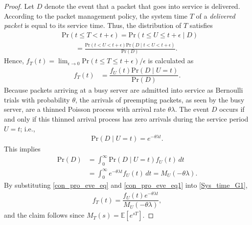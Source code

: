 \documentclass[conference]{IEEEtran}
\newcommand{\nn}{\nonumber\\}
\begin{document}
\begin{proof}
Let $D$ denote the event that a packet that goes into service is delivered. According to the packet management policy, the system time $T$ of a \textit{delivered packet} is equal to its service time. Thus, the distribution of $T$ satisfies
\begin{align}
&\mathrm{Pr}(t\le T<t+\epsilon)=\mathrm{Pr}(t\le U\le t+\epsilon\mid D)\nn
&\qquad=\frac{\mathrm{Pr}(t<U<t+\epsilon)\mathrm{Pr}(D\mid t<U<t+\epsilon)}{\mathrm{Pr}(D)}.
\end{align}
 Hence, $f_{T}(t)=\lim_{\epsilon\to0}\mathrm{Pr}(t\le T\le t+\epsilon)/\epsilon$ is calculated as 
 \begin{align}\label{Sys_time_G1}
  f_T(t)&= \dfrac{f_U(t)\mathrm{Pr}(D\mid U=t)}{\mathrm{Pr}(D)}.  
 \end{align}
% 
%
Because packets arriving at a busy server are admitted into service as Bernoulli trials with probability $\theta$, the arrivals of preempting packets, as  seen by the busy server, are a thinned Poisson process with arrival rate $\theta\lambda$. The event  $D$ occurs if and only if this thinned arrival process has zero arrivals during the service period $U=t$; i.e., \begin{align}\label{con_pro_eve_eq}
\mathrm{Pr}(D\mid U=t)=e^{-\theta\lambda t}.
    \end{align}
This implies 
\begin{align}
\mathrm{Pr}(D)&=\int_{0}^{\infty}\mathrm{Pr}(D\mid U=t)f_U(t)\,dt\nn
&=\int_{0}^{\infty}e^{-\theta\lambda t}f_U(t)\,dt
=M_{U}(-\theta\lambda).
\label{con_pro_eve_eq1}
\end{align}
By substituting \eqref{con_pro_eve_eq} and \eqref{con_pro_eve_eq1} into \eqref{Sys_time_G1}, 
\begin{align}
    f_{T}(t)=\dfrac{f_U(t)e^{-\theta\lambda t}}{M_{U}(-\theta\lambda)},
    \label{f_t1_0}
\end{align}
and the claim follows since $M_{T}(s)=\mathbb{E}[e^{sT}]$. 
\end{proof}
\end{document}
